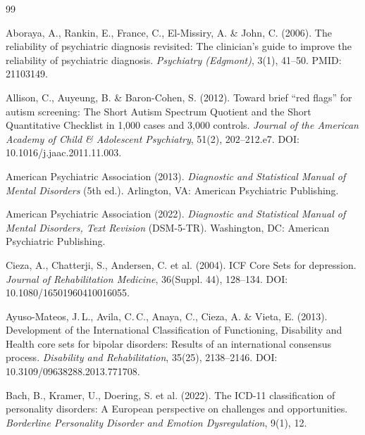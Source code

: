 \documentclass[11pt,a4paper]{article}
\begin{document}
\newpage
\begin{thebibliography}{99}

Aboraya, A., Rankin, E., France, C., El-Missiry, A. \& John, C. (2006).
\newblock The reliability of psychiatric diagnosis revisited: The clinician's guide to improve the reliability of psychiatric diagnosis.
\newblock \textit{Psychiatry (Edgmont)}, 3(1), 41--50. PMID: 21103149.

Allison, C., Auyeung, B. \& Baron-Cohen, S. (2012).
\newblock Toward brief ``red flags'' for autism screening: The Short Autism Spectrum Quotient and the Short Quantitative Checklist in 1,000 cases and 3,000 controls.
\newblock \textit{Journal of the American Academy of Child \& Adolescent Psychiatry}, 51(2), 202--212.e7. DOI: 10.1016/j.jaac.2011.11.003.

American Psychiatric Association (2013).
\newblock \textit{Diagnostic and Statistical Manual of Mental Disorders} (5th ed.).
\newblock Arlington, VA: American Psychiatric Publishing.

American Psychiatric Association (2022).
\newblock \textit{Diagnostic and Statistical Manual of Mental Disorders, Text Revision} (DSM-5-TR).
\newblock Washington, DC: American Psychiatric Publishing.

Cieza, A., Chatterji, S., Andersen, C. et al. (2004).
\newblock ICF Core Sets for depression.
\newblock \textit{Journal of Rehabilitation Medicine}, 36(Suppl. 44), 128--134. DOI: 10.1080/16501960410016055.

Ayuso-Mateos, J.\,L., Avila, C.\,C., Anaya, C., Cieza, A. \& Vieta, E. (2013).
\newblock Development of the International Classification of Functioning, Disability and Health core sets for bipolar disorders: Results of an international consensus process.
\newblock \textit{Disability and Rehabilitation}, 35(25), 2138--2146. DOI: 10.3109/09638288.2013.771708.

Bach, B., Kramer, U., Doering, S. et al. (2022).
\newblock The ICD-11 classification of personality disorders: A European perspective on challenges and opportunities.
\newblock \textit{Borderline Personality Disorder and Emotion Dysregulation}, 9(1), 12.


\end{thebibliography}
\end{document}
